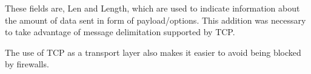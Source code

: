 These fields are, Len and Length, which are used to indicate information about the amount of data sent in form of payload/options.  
This addition was necessary to take advantage of message delimitation supported by TCP.

The use of TCP as a transport layer also makes it easier to avoid being blocked by firewalls.  

%
%
%





% 
%
%
%
%
%



